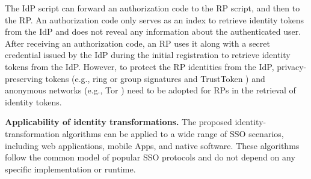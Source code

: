 The IdP script can forward an authorization code to the RP script,
 and then to the RP. %
 An authorization code only serves as an index to retrieve identity tokens from the IdP
  and does not reveal any information about the authenticated user.
After receiving an authorization code,
 an RP uses it along with a secret credential issued by the IdP during the initial registration \cite{OpenIDConnect}
  to retrieve identity tokens from the IdP.
  However, to protect the RP identities from the IdP, privacy-preserving tokens
   (e.g., ring or group signatures \cite{ring-sig,chaum1991group} and TrustToken \cite{trusttoken})
   and anonymous networks (e.g., Tor \cite{tor}) need to be adopted for RPs in the retrieval of identity tokens.



\noindent \textbf{Applicability of identity transformations.}
The proposed identity-transformation algorithms %
can be applied to a wide range of SSO scenarios, including web applications, mobile Apps, and native software.
These algorithms follow the common model of popular SSO protocols and do not depend on any specific implementation or runtime.%

